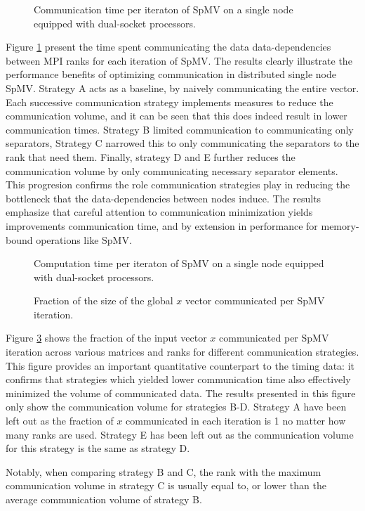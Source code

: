 \begin{figure}[H]
    \centering
    \caption{Communication time per iteraton of SpMV on a single node equipped with dual-socket  processors.}
    \label{fig:tcommdefqsingle}
\end{figure}

Figure \ref{fig:tcommdefqsingle} present the time spent communicating the data data-dependencies between MPI ranks for each iteration of SpMV. The results clearly illustrate the performance benefits of optimizing communication in distributed single node SpMV. Strategy A acts as a baseline, by naively communicating the entire vector. Each successive communication strategy implements measures to reduce the communication volume, and it can be seen that this does indeed result in lower communication times. Strategy B limited communication to communicating only separators, Strategy C narrowed this to only communicating the separators to the rank that need them. Finally, strategy D and E further reduces the communication volume by only communicating necessary separator elements. This progresion confirms the role communication strategies play in reducing the bottleneck that the data-dependencies between nodes induce. The results emphasize that careful attention to communication minimization yields improvements communication time, and by extension in performance for memory-bound operations like SpMV.

\begin{figure}[H]
    \centering
    \caption{Computation time per iteraton of SpMV on a single node equipped with dual-socket  processors.}
    \label{fig:tcompdefqsingle}
\end{figure}

\begin{figure}[H]
    \centering
    \caption{Fraction of the size of the global \(x\) vector communicated per SpMV iteration.}
    \label{fig:commloaddefqsingle}
\end{figure}
Figure \ref{fig:commloaddefqsingle} shows the fraction of the input vector \(x\) communicated per SpMV iteration across various matrices and ranks for different communication strategies. This figure provides an important quantitative counterpart to the timing data: it confirms that strategies which yielded lower communication time also effectively minimized the volume of communicated data. The results presented in this figure only show the communication volume for strategies B-D. Strategy A have been left out as the fraction of \(x\) communicated in each iteration is 1 no matter how many ranks are used. Strategy E has been left out as the communication volume for this strategy is the same as strategy D.
\medskip

Notably, when comparing strategy B and C, the rank with the maximum communication volume in strategy C is usually equal to, or lower than the average communication volume of strategy B.


